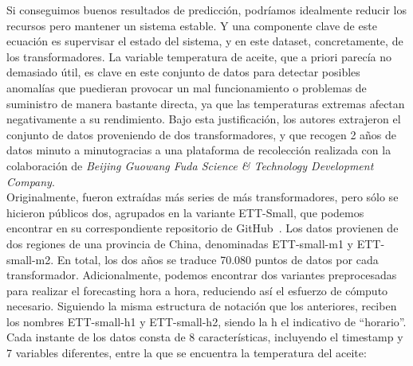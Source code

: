Si conseguimos buenos resultados de predicción, podríamos idealmente reducir los recursos pero mantener un sistema estable. Y una componente clave de este ecuación es supervisar el estado del sistema, y en este dataset, concretamente, de los transformadores. La variable temperatura de aceite, que a priori parecía no demasiado útil, es clave en este conjunto de datos para detectar posibles anomalías que puedieran provocar un mal funcionamiento o problemas de suministro de manera bastante directa, ya que las temperaturas extremas afectan negativamente a su rendimiento. Bajo esta justificación, los autores extrajeron el conjunto de datos proveniendo de dos transformadores, y que recogen 2 años de datos minuto a minutogracias a una plataforma de recolección realizada con la colaboración de \textit{Beijing Guowang Fuda Science \& Technology Development Company}.\\

Originalmente, fueron extraídas más series de más transformadores, pero sólo se hicieron públicos dos, agrupados en la variante ETT-Small, que podemos encontrar en su correspondiente repositorio de GitHub~\cite{zhou2021etdataset}. Los datos provienen de dos regiones de una provincia de China, denominadas ETT-small-m1 y ETT-small-m2. En total, los dos años se traduce 70.080 puntos de datos por cada transformador. Adicionalmente, podemos encontrar dos variantes preprocesadas para realizar el forecasting hora a hora, reduciendo así el esfuerzo de cómputo necesario. Siguiendo la misma estructura de notación que los anteriores, reciben los nombres ETT-small-h1 y ETT-small-h2, siendo la h el indicativo de ``horario''.\\

Cada instante de los datos consta de 8 características, incluyendo el timestamp y 7 variables diferentes, entre la que se encuentra la temperatura del aceite:

